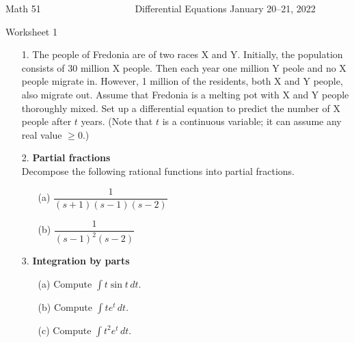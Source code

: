 \documentclass[12pt]{article}
\begin{document}

\noindent
Math 51~~~~~~~~~~~~~~~~~~~ \hfill Differential Equations \hfill January 20--21, 2022 
 \centerline{Worksheet 1}

\begin{enumerate}
\item[1.]  The people of Fredonia are of two races X and Y.
Initially, the population consists of 30 million X people.
Then each year one million Y peole and no X people migrate in.
However, 1 million of the residents, both X and Y people, also migrate
out.
Assume that Fredonia is a melting pot with X and Y people thoroughly
mixed.
Set up a differential equation to predict the number of X people after
$t$ years.  (Note that $t$ is a continuous variable; it can assume any
real value $\ge 0$.)

\newpage
\item[2.] \textbf{Partial fractions}\\
  Decompose the following rational functions into partial fractions.
  \begin{enumerate}
  \item[(a)] $\dfrac{1}{(s+1)(s-1)(s-2)}$
  \item[(b)] $\dfrac{1}{(s-1)^2(s-2)}$
  \end{enumerate}

\newpage

\item[3.] \textbf{Integration by parts}
  \begin{enumerate}
  \item[(a)] Compute $\displaystyle \int t \sin t\, dt$.
  \item[(b)] Compute $\displaystyle \int t e^t\,dt$.
    \item[(c)] Compute $\displaystyle \int t^2 e^t\,dt$.
  \end{enumerate}
\end{enumerate} 
\end{document}
